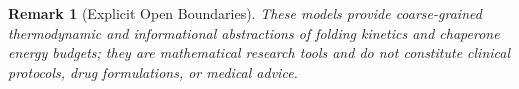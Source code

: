 \documentclass[11pt,a4paper]{article}
\newtheorem{remark}{Remark}
\begin{document}
\begin{remark}[Explicit Open Boundaries]
These models provide coarse-grained thermodynamic and informational abstractions of folding kinetics and chaperone energy budgets; they are mathematical research tools and do not constitute clinical protocols, drug formulations, or medical advice.
\end{remark}
\end{document}
